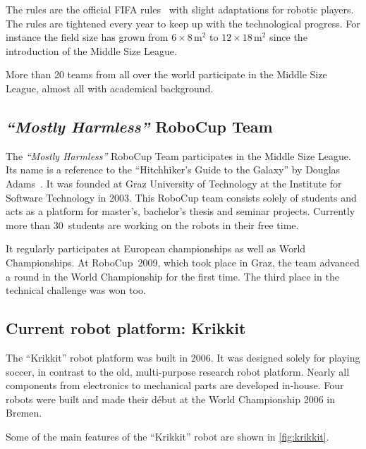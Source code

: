 \documentclass[12pt,a4paper]{article}
\newcommand{\MH}{\emph{``Mostly Harmless''} RoboCup Team\xspace}
\newcommand{\MSL}{Middle Size League\xspace}
\begin{document}
The rules are the official FIFA rules~\cite{msl-rules} with slight adaptations for robotic players.
The rules are tightened every year to keep up with the technological progress. 
For instance the field size has grown from $6\times8$\,m$^2$ to $12\times18$\,m$^2$ since the introduction of the \MSL.

More than 20 teams from all over the world participate in the \MSL, almost all with academical background.


\subsection{\MH}

The \MH participates in the \MSL. 
Its name is a reference to the ``Hitchhiker's Guide to the Galaxy'' by Douglas Adams~\cite{h2g2}.
It was founded at Graz University of Technology at the Institute for Software Technology in 2003. 
This RoboCup team consists solely of students and acts as a platform for master's, bachelor's thesis and seminar projects.
Currently more than 30~students are working on the robots in their free time.

It regularly participates at European championships as well as World Championships.
At RoboCup~2009, which took place in Graz, the team advanced a round in the World Championship for the first time.
The third place in the technical challenge was won too.




\subsection{Current robot platform: Krikkit}

The ``Krikkit'' robot platform was built in 2006.%
It was designed solely for playing soccer, in contrast to the old, multi-purpose research robot platform.
Nearly all components from electronics to mechanical parts are developed in-house.
Four robots were built and made their d\'ebut at the World Championship 2006 in Bremen.

Some of the main features of the ``Krikkit'' robot are shown in \autoref{fig:krikkit}.
\end{document}

